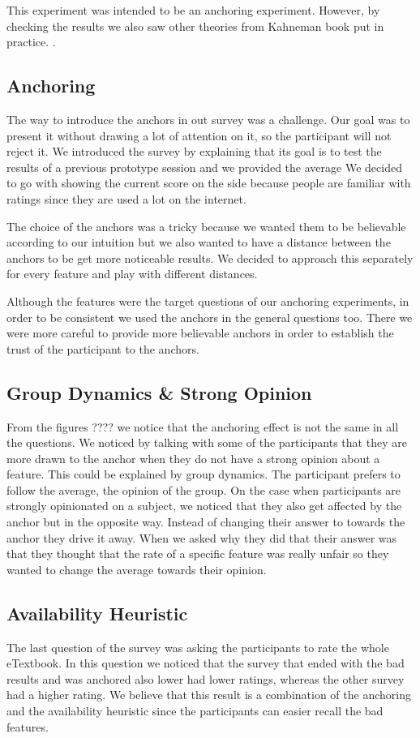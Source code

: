 \documentclass[Main.tex]{subfiles}
\begin{document}
This experiment was intended to be an anchoring experiment. However, by checking the results we also saw other theories from Kahneman book  put in practice. . 

\subsection{Anchoring}
The way to introduce the anchors in out survey was a challenge. Our goal was to present it without drawing a lot of attention on it, so the participant will not reject it. We introduced the survey by explaining that its goal is to test the results of a previous prototype session and we provided the average We decided to go with showing the current score on the side because people are familiar with ratings since they are used a lot on the internet.

The choice of the anchors was a tricky because we wanted them to be believable according to our intuition but we also wanted to have a distance between the anchors to be get more noticeable results. We decided to approach this separately for every feature and play with different distances.

Although the features were the target questions of our anchoring experiments, in order to be consistent we used the anchors in the general questions too. There we were more careful to provide more believable anchors in order to establish the trust of the participant to the anchors.


\subsection{Group Dynamics \& Strong Opinion}
From the figures ???? we notice that the anchoring effect is not the same in all the questions. We noticed by talking with some of the participants that they are more drawn to the anchor when they do not have a strong opinion about a feature. This could be explained by group dynamics. The participant prefers to follow the average, the opinion of the group. On the case when  participants are strongly opinionated on a subject, we noticed that they also get affected by the anchor but in the opposite way. Instead of changing their answer to towards the anchor they drive it away. When we asked why they did that their answer was that they thought that the rate of a specific feature was really unfair so they wanted to change the average towards their opinion. 

\subsection{Availability Heuristic}
The last question of the survey was asking the participants to rate the whole eTextbook. In this question we noticed that the survey that ended with the bad results and was anchored also lower had lower ratings, whereas the other survey had a higher rating. We believe that this result is a combination of the anchoring and the availability heuristic since the participants can easier recall the bad features. 

\end{document}
